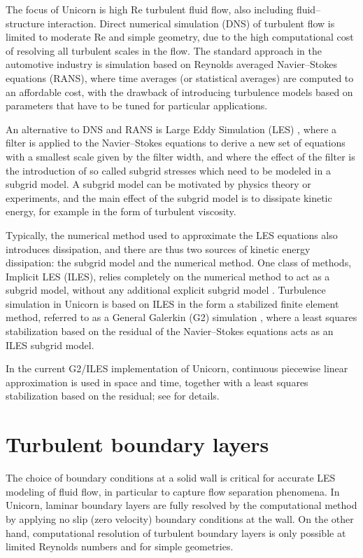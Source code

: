 The focus of Unicorn is high Re turbulent fluid flow, also including
fluid--structure interaction. Direct numerical simulation (DNS) of
turbulent flow is limited to moderate Re and simple geometry, due to
the high computational cost of resolving all turbulent scales in the
flow. The standard approach in the automotive industry is simulation
based on Reynolds averaged Navier--Stokes equations (RANS), where time
averages (or statistical averages) are computed to an affordable cost,
with the drawback of introducing turbulence models based on parameters
that have to be tuned for particular applications.

An alternative to DNS and RANS is Large Eddy Simulation (LES)
\citep{Sagaut2005}, where a filter is applied to the Navier--Stokes
equations to derive a new set of equations with a smallest scale given by
the filter width, and where the effect of the filter is the introduction
of so called subgrid stresses which need to be modeled in a subgrid
model. A subgrid model can be motivated by physics theory or experiments,
and the main effect of the subgrid model is to dissipate kinetic energy,
for example in the form of turbulent viscosity.

Typically, the numerical method used to approximate the LES equations also
introduces dissipation, and there are thus two sources of kinetic energy
dissipation: the subgrid model and the numerical method. One class of
methods, Implicit LES (ILES), relies completely on the numerical method
to act as a subgrid model, without any additional explicit subgrid model
\citep{Sagaut2005}. Turbulence simulation in Unicorn is based on ILES
in the form a stabilized finite element method, referred to as a
General Galerkin (G2) simulation \citep{HoffmanJohnson2007}, where a
least squares stabilization based on the residual of the
Navier--Stokes equations acts as an ILES subgrid model.

In the current G2/ILES implementation of Unicorn, continuous piecewise
linear approximation is used in space and time, together with a least
squares stabilization based on the residual;
see \citet{HoffmanJohnson2007} for details.

\section{Turbulent boundary layers}
\label{hoffman-1:section:blayer}

The choice of boundary conditions at a solid wall is critical for
accurate LES modeling of fluid flow, in particular to capture flow
separation phenomena. In Unicorn, laminar boundary layers are fully
resolved by the computational method by applying no slip (zero
velocity) boundary conditions at the wall. On the other hand,
computational resolution of turbulent boundary layers is only possible
at limited Reynolds numbers and for simple geometries.


